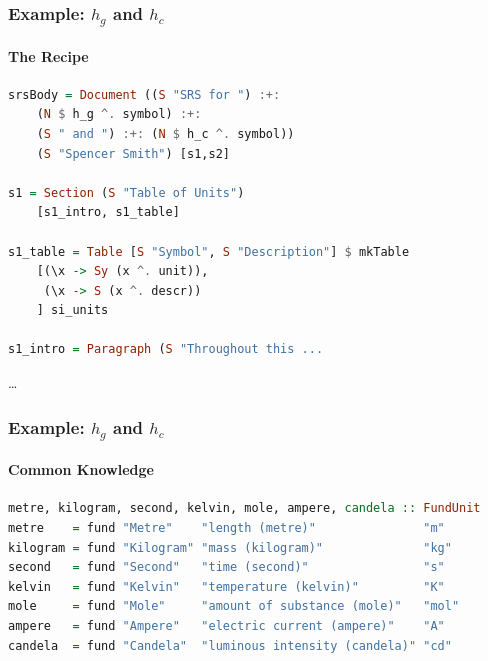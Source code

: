 \documentclass{beamer}
\begin{document}


\begin{frame}[fragile]

\frametitle{Example: $h_g$ and $h_c$}

\framesubtitle{The Recipe}


\begin{lstlisting}[language=Haskell, frame=single, showstringspaces=false, basicstyle=\scriptsize]
srsBody = Document ((S "SRS for ") :+: 
    (N $ h_g ^. symbol) :+: 
    (S " and ") :+: (N $ h_c ^. symbol)) 
    (S "Spencer Smith") [s1,s2]

s1 = Section (S "Table of Units") 
    [s1_intro, s1_table]

s1_table = Table [S "Symbol", S "Description"] $ mkTable
    [(\x -> Sy (x ^. unit)),
     (\x -> S (x ^. descr))
    ] si_units

s1_intro = Paragraph (S "Throughout this ...
\end{lstlisting} 
\LARGE{\ldots}


\end{frame}


\begin{frame}[fragile]
\frametitle{Example: $h_g$ and $h_c$}
\framesubtitle{Common Knowledge}


\begin{lstlisting}[language=Haskell, frame=single, showstringspaces=false, basicstyle=\tiny]
metre, kilogram, second, kelvin, mole, ampere, candela :: FundUnit
metre    = fund "Metre"    "length (metre)"               "m"
kilogram = fund "Kilogram" "mass (kilogram)"              "kg"
second   = fund "Second"   "time (second)"                "s"
kelvin   = fund "Kelvin"   "temperature (kelvin)"         "K"
mole     = fund "Mole"     "amount of substance (mole)"   "mol"
ampere   = fund "Ampere"   "electric current (ampere)"    "A"
candela  = fund "Candela"  "luminous intensity (candela)" "cd"
\end{lstlisting}


\end{frame}
\end{document}
